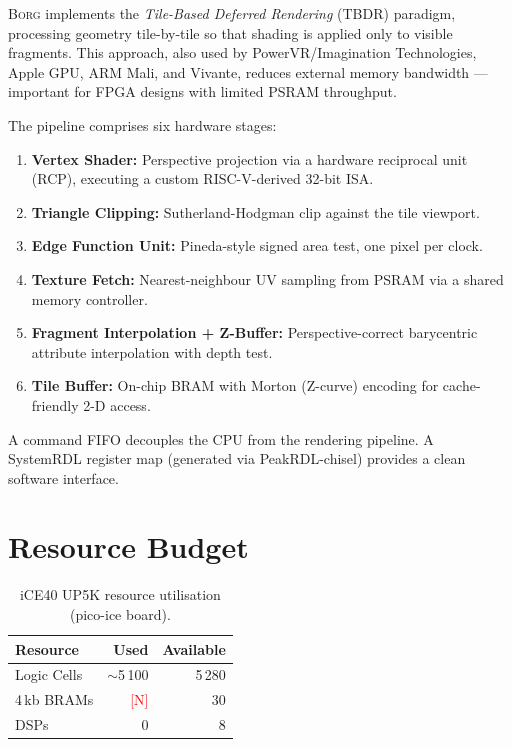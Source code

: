 \documentclass[sigconf,review,natbib=false]{acmart}
\newcommand{\todo}[1]{\textcolor{red}{[#1]}}
\begin{document}
\textsc{Borg} implements the \emph{Tile-Based Deferred Rendering} (TBDR)
paradigm, processing geometry tile-by-tile so that shading is applied
only to visible fragments.
This approach, also used by PowerVR/Imagination Technologies, Apple GPU,
ARM Mali, and Vivante, reduces external memory bandwidth — important
for FPGA designs with limited PSRAM throughput.

The pipeline comprises six hardware stages:
\begin{enumerate}
  \item \textbf{Vertex Shader:} Perspective projection via a hardware
    reciprocal unit (RCP), executing a custom RISC-V-derived 32-bit ISA.
  \item \textbf{Triangle Clipping:} Sutherland-Hodgman clip against
    the tile viewport.
  \item \textbf{Edge Function Unit:} Pineda-style signed area test,
    one pixel per clock.
  \item \textbf{Texture Fetch:} Nearest-neighbour UV sampling from PSRAM
    via a shared memory controller.
  \item \textbf{Fragment Interpolation + Z-Buffer:} Perspective-correct
    barycentric attribute interpolation with depth test.
  \item \textbf{Tile Buffer:} On-chip BRAM with Morton (Z-curve) encoding
    for cache-friendly 2-D access.
\end{enumerate}

A command FIFO decouples the CPU from the rendering pipeline.
A SystemRDL register map (generated via PeakRDL-chisel) provides
a clean software interface.

\section{Resource Budget}

\begin{table}[h]
  \centering
  \caption{iCE40 UP5K resource utilisation (pico-ice board).}
  \begin{tabular}{@{}lrr@{}}
    \toprule
    Resource & Used & Available \\
    \midrule
    Logic Cells & $\sim$5\,100 & 5\,280 \\
    4\,kb BRAMs & \todo{N} & 30 \\
    DSPs        & 0 & 8 \\
    \bottomrule
  \end{tabular}
\end{table}
\end{document}
